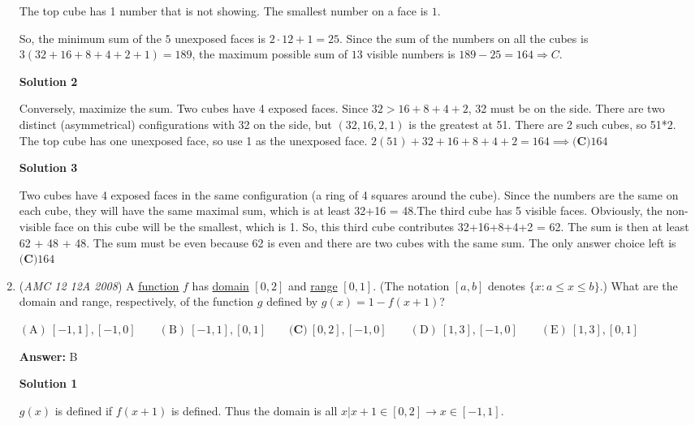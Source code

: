 \begin{enumerate}
 The top cube has 1 number that is not showing. The smallest number on a face is $1$. 

 So, the minimum sum of the $5$ unexposed faces is $2\cdot12+1=25$.  Since the sum of the numbers on all the cubes is $3(32+16+8+4+2+1)=189$, the maximum possible sum of $13$ visible numbers is $189-25=164 \Rightarrow C$. 

 



\textbf{Solution 2}

Conversely, maximize the sum. Two cubes have 4 exposed faces. Since $32>16+8+4+2$, 32 must be on the side. There are two distinct (asymmetrical) configurations with 32 on the side, but $(32,16,2,1)$ is the greatest at 51. There are 2 such cubes, so 51*2. The top cube has one unexposed face, so use 1 as the unexposed face. $2(51)+32+16+8+4+2=164 \implies \boxed{\textbf{(C)} 164}$




\textbf{Solution 3}

Two cubes have 4 exposed faces in the same configuration (a ring of 4 squares around the cube). Since the numbers are the same on each cube, they will have the same maximal sum, which is at least 32+16 = 48.The third cube has 5 visible faces. Obviously, the non-visible face on this cube will be the smallest, which is 1. So, this third cube contributes 32+16+8+4+2 = 62. The sum is then at least 62 + 48 + 48. The sum must be even because 62 is even and there are two cubes with the same sum. The only answer choice left is $\boxed{\textbf{(C)} 164}$



	\item (\textit{AMC 12 12A 2008}) A \href{https://artofproblemsolving.com/wiki/index.php?title=Function}{function} $f$ has \href{https://artofproblemsolving.com/wiki/index.php?title=Domain}{domain} $[0,2]$ and \href{https://artofproblemsolving.com/wiki/index.php?title=Range}{range} $[0,1]$. (The notation $[a,b]$ denotes $\{x:a \le x \le b \}$.) What are the domain and range, respectively, of the function $g$ defined by $g(x)=1-f(x+1)$?


 $\mathrm{(A)}\ [-1,1],[-1,0]\qquad\mathrm{(B)}\ [-1,1],[0,1]\qquad\textbf{(C)}\ [0,2],[-1,0]\qquad\mathrm{(D)}\ [1,3],[-1,0]\qquad\mathrm{(E)}\ [1,3],[0,1]$

 \textbf{Answer: }B



\textbf{Solution 1}

$g(x)$ is defined if $f(x + 1)$ is defined. Thus the domain is all $x| x + 1 \in [0,2] \rightarrow x \in [ - 1,1]$. 


\end{enumerate}

